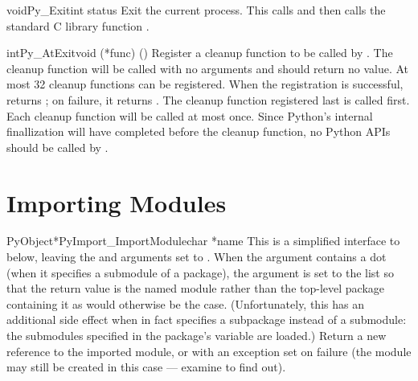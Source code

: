 \documentclass{manual}
\begin{document}
\begin{cfuncdesc}{void}{Py_Exit}{int status}
Exit the current process.  This calls
 and
then calls the standard C library function
.
\end{cfuncdesc}

\begin{cfuncdesc}{int}{Py_AtExit}{void (*func) ()}
Register a cleanup function to be called by
.
The cleanup function will be called with no arguments and should
return no value.  At most 32 cleanup
functions can be registered.
When the registration is successful,  returns
; on failure, it returns .  The cleanup function
registered last is called first.  Each cleanup function will be called
at most once.  Since Python's internal finallization will have
completed before the cleanup function, no Python APIs should be called
by .
\end{cfuncdesc}


\section{Importing Modules \label{importing}}

\begin{cfuncdesc}{PyObject*}{PyImport_ImportModule}{char *name}
This is a simplified interface to
 below, leaving the
 and  arguments set to \NULL{}.  When the
 argument contains a dot (when it specifies a
submodule of a package), the  argument is set to the
list \code{['*']} so that the return value is the named module rather
than the top-level package containing it as would otherwise be the
case.  (Unfortunately, this has an additional side effect when
 in fact specifies a subpackage instead of a submodule: the
submodules specified in the package's  variable are
loaded.)  Return a
new reference to the imported module, or
\NULL{} with an exception set on failure (the module may still be
created in this case --- examine  to find out).
\end{cfuncdesc}
\end{document}
